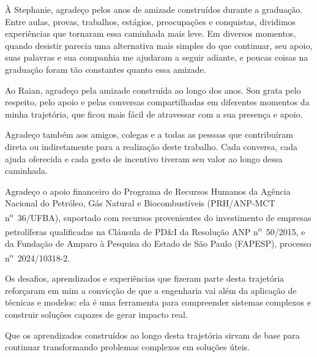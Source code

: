 \begin{agradecimentos}
À Stephanie, agradeço pelos anos de amizade construídos durante a graduação. Entre aulas, provas, trabalhos, estágios, preocupações e conquistas, dividimos experiências que tornaram essa caminhada mais leve. Em diversos momentos, quando desistir parecia uma alternativa mais simples do que continuar, seu apoio, suas palavras e sua companhia me ajudaram a seguir adiante, e poucas coisas na graduação foram tão constantes quanto essa amizade.

Ao Raian, agradeço pela amizade construída ao longo dos anos. Sou grata pelo respeito, pelo apoio e pelas conversas compartilhadas em diferentes momentos da minha trajetória, que ficou mais fácil de atravessar com a sua presença e apoio.

Agradeço também aos amigos, colegas e a todas as pessoas que contribuíram direta ou indiretamente para a realização deste trabalho. Cada conversa, cada ajuda oferecida e cada gesto de incentivo tiveram seu valor ao longo dessa caminhada.

Agradeço o apoio financeiro do Programa de Recursos Humanos da Agência Nacional do Petróleo, Gás Natural e Biocombustíveis (PRH/ANP-MCT n\textsuperscript{o}~36/UFBA), suportado com recursos provenientes do investimento de empresas petrolíferas qualificadas na Cláusula de PD\&I da Resolução ANP n\textsuperscript{o}~50/2015, e da Fundação de Amparo à Pesquisa do Estado de São Paulo (FAPESP), processo n\textsuperscript{o}~2024/10318-2.

Os desafios, aprendizados e experiências que fizeram parte desta trajetória reforçaram em mim a convicção de que a engenharia vai além da aplicação de técnicas e modelos: ela é uma ferramenta para compreender sistemas complexos e construir soluções capazes de gerar impacto real.

Que os aprendizados construídos ao longo desta trajetória sirvam de base para continuar transformando problemas complexos em soluções úteis.

\end{agradecimentos}